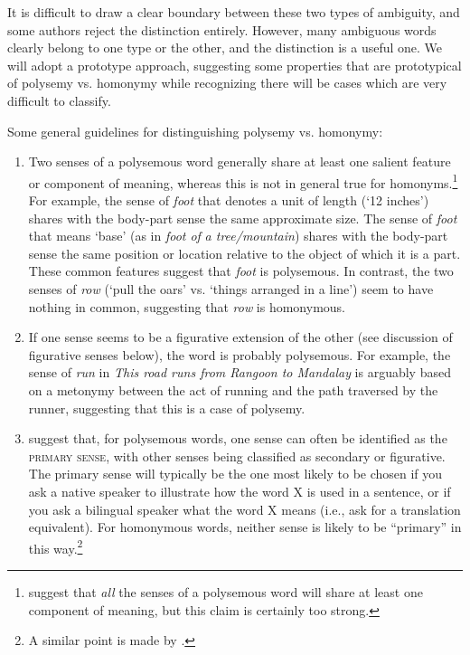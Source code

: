 It is difficult to draw a clear boundary between these two types of ambiguity, and some authors reject the distinction entirely. However, many ambiguous words clearly belong to one type or the other, and the distinction is a useful one. We will adopt a prototype approach, suggesting some properties that are prototypical of polysemy vs. homonymy while recognizing there will be cases which are very difficult to classify.


Some general guidelines for distinguishing polysemy vs. homonymy:

\begin{enumerate}[label=\alph*.]
\item Two senses of a polysemous word generally share at least one salient feature or component of meaning, whereas this is not in general true for homonyms.\footnote{\citet{BeekmanCallow1974} suggest that \textit{all} the senses of a polysemous word will share at least one component of meaning, but this claim is certainly too strong.} For example, the sense of \textit{foot} that denotes a unit of length (‘12 inches’) shares with the body-part sense the same approximate size. The sense of \textit{foot} that means ‘base’ (as in \textit{foot of} \textit{a tree/mountain}) shares with the body-part sense the same position or location relative to the object of which it is a part. These common features suggest that \textit{foot} is polysemous. In contrast, the two senses of \textit{row} (‘pull the oars’ vs. ‘things arranged in a line’) seem to have nothing in common, suggesting that \textit{row} is homonymous.
\item If one sense seems to be a figurative extension of the other (see discussion of figurative senses below), the word is probably polysemous. For example, the sense of \textit{run} in \textit{This road runs from Rangoon to Mandalay} is arguably based on a metonymy between the act of running and the path traversed by the runner, suggesting that this is a case of polysemy.
\item \citet{BeekmanCallow1974} suggest that, for polysemous words, one sense can often be identified as the \textsc{primary sense}, with other senses being classified as secondary or figurative. The primary sense will typically be the one most likely to be chosen if you ask a native speaker to illustrate how the word X is used in a sentence, or if you ask a bilingual speaker what the word X means (i.e., ask for a translation equivalent). For homonymous words, neither sense is likely to be “primary” in this way.\footnote{A similar point is made by    \citet[100]{FillmoreAtkins2000}.}

\end{enumerate}
